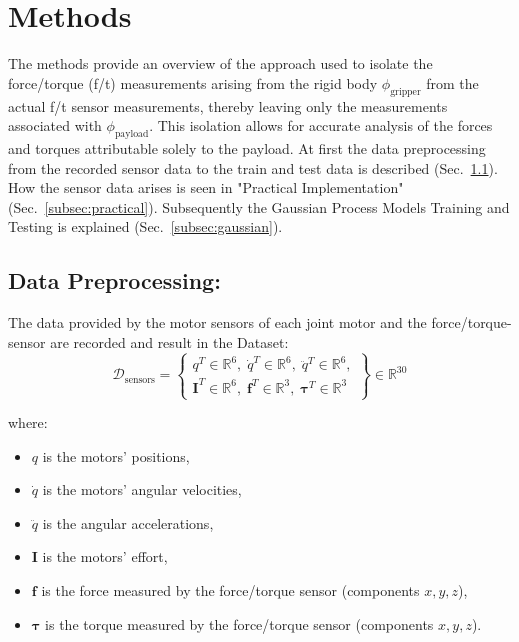 \section{Methods}
    The methods provide an overview of the approach used to isolate the force/torque (f/t) measurements arising from the rigid body \(\phi_{\text{gripper}}\) from the actual f/t sensor measurements, thereby leaving only the measurements associated with \(\phi_{\text{payload}}\). This isolation allows for accurate analysis of the forces and torques attributable solely to the payload. At first the data preprocessing from the recorded sensor data to the train and test data is described (Sec.~\ref{subsec:preprocess}). How the sensor data arises is seen in "Practical Implementation" (Sec.~\ref{subsec:practical}). Subsequently the Gaussian Process Models Training and Testing is explained (Sec.~\ref{subsec:gaussian}). 

    \subsection{Data Preprocessing:}
    \label{subsec:preprocess}
    The data provided by the motor sensors of each joint motor and the force/torque-sensor are recorded and result in the Dataset:
    \begin{equation}
    \mathcal{D}_{\text{sensors}} = \left\{
    \begin{array}{l}
    q^T \in \mathbb{R}^{6}, \; \dot{q}^T \in \mathbb{R}^{6}, \; \ddot{q}^T \in \mathbb{R}^{6}, \\
    \boldsymbol{I}^T \in \mathbb{R}^{6}, \; \boldsymbol{f}^T \in \mathbb{R}^{3}, \; \boldsymbol{\tau}^T \in \mathbb{R}^{3}
    \end{array} 
    \right\}
    \in \mathbb{R}^{30}
    \label{eq:dataset_raw}
    \end{equation}
    
    where:
    \begin{itemize}
        \item $q$ is the motors' positions,
        \item $\dot{q}$ is the motors' angular velocities,
        \item $\ddot{q}$ is the angular accelerations,
        \item $\boldsymbol{I}$ is the motors' effort,
        \item $\boldsymbol{f}$ is the force measured by the force/torque sensor (components $x, y, z$),
        \item $\boldsymbol{\tau}$ is the torque measured by the force/torque sensor (components $x, y, z$).
    \end{itemize}

